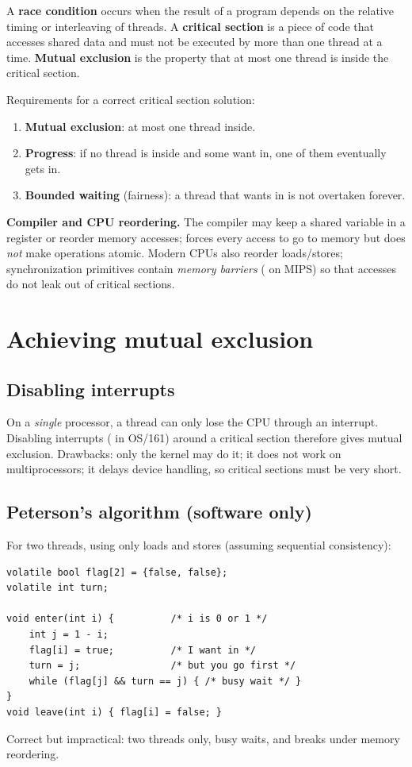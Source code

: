 \begin{definition}
A \textbf{race condition} occurs when the result of a program depends on the relative timing
or interleaving of threads. A \textbf{critical section} is a piece of code that accesses shared
data and must not be executed by more than one thread at a time. \textbf{Mutual exclusion} is
the property that at most one thread is inside the critical section.
\end{definition}

Requirements for a correct critical section solution:
\begin{enumerate}
  \item \textbf{Mutual exclusion}: at most one thread inside.
  \item \textbf{Progress}: if no thread is inside and some want in, one of them eventually
    gets in.
  \item \textbf{Bounded waiting} (fairness): a thread that wants in is not overtaken forever.
\end{enumerate}

\begin{aside}
\textbf{Compiler and CPU reordering.} The compiler may keep a shared variable in a register or
reorder memory accesses;  forces every access to go to memory but does
\emph{not} make operations atomic. Modern CPUs also reorder loads/stores; synchronization
primitives contain \emph{memory barriers} ( on MIPS) so that accesses do not leak
out of critical sections.
\end{aside}

\section{Achieving mutual exclusion}

\subsection{Disabling interrupts}
On a \emph{single} processor, a thread can only lose the CPU through an interrupt. Disabling
interrupts ( in OS/161) around a critical section therefore gives mutual
exclusion. Drawbacks: only the kernel may do it; it does not work on multiprocessors; it delays
device handling, so critical sections must be very short.

\subsection{Peterson's algorithm (software only)}
For two threads, using only loads and stores (assuming sequential consistency):
\begin{lstlisting}[style=c]
volatile bool flag[2] = {false, false};
volatile int turn;

void enter(int i) {          /* i is 0 or 1 */
    int j = 1 - i;
    flag[i] = true;          /* I want in */
    turn = j;                /* but you go first */
    while (flag[j] && turn == j) { /* busy wait */ }
}
void leave(int i) { flag[i] = false; }
\end{lstlisting}
Correct but impractical: two threads only, busy waits, and breaks under memory reordering.

